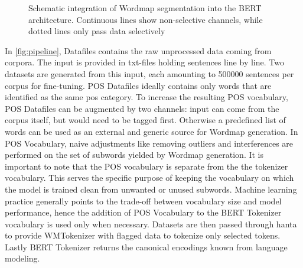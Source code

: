 \begin{figure}
    \caption{Schematic integration of Wordmap segmentation into the BERT architecture. Continuous lines show non-selective channels, while dotted lines only pass data selectively}
    \label{fig:pipeline}
\end{figure}

In \autoref{fig:pipeline}, Datafiles contains the raw unprocessed data coming from corpora.
The input is provided in txt-files holding sentences line by line.
Two datasets are generated from this input, each amounting to 500000 sentences per corpus for fine-tuning.
POS Datafiles ideally contains only words that are identified as the same \ac{pos} category.
To increase the resulting POS vocabulary, POS Datafiles can be augmented by two channels: input can come from the corpus itself, but would need to be tagged first.
Otherwise a predefined list of words can be used as an external and generic source for Wordmap generation.
In POS Vocabulary, naive adjustments like removing outliers and interferences are performed on the set of subwords yielded by Wordmap generation.
It is important to note that the POS vocabulary is separate from the the tokenizer vocabulary.
This serves the specific purpose of keeping the vocabulary on which the model is trained clean from unwanted or unused subwords.
Machine learning practice generally points to the trade-off between vocabulary size and model performance, hence the addition of POS Vocabulary to the BERT Tokenizer vocabulary is used only when necessary.
Datasets are then passed through \ac{hanta} to provide WMTokenizer with flagged data to tokenize only selected tokens.
Lastly BERT Tokenizer returns the canonical encodings known from language modeling.

